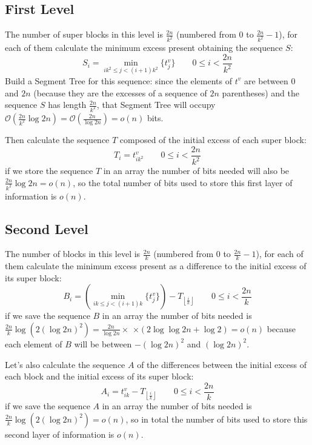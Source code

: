 \documentclass{article}
\begin{document}
\subsection{First Level}
The number of super blocks in this level is $\frac{2n}{k^2}$ (numbered from $0$ to $\frac{2n}{k^2}-1$), for each of them calculate the minimum excess present obtaining the sequence $S$:
    $$
    S_i = \min_{ik^2 \leq j < (i+1)k^2}\{t^v_j\} \qquad 0\leq i < \frac{2n}{k^2}
    $$
Build a Segment Tree for this sequence: since the elements of $t^v$ are between $0$ and $2n$ (because they are the excesses of a sequence of $2n$ parentheses) and the sequence $S$ has length $\frac{2n}{k^2}$, that Segment Tree will occupy $\mathcal{O}(\frac{2n}{k^2}\log{2n})=\mathcal{O}(\frac{2n}{\log{2n}})=o(n)$ bits.

Then calculate the sequence $T$ composed of the initial excess of each super block:
    $$
    T_i = t^v_{ik^2} \qquad 0\leq i < \frac{2n}{k^2}
    $$
if we store the sequence $T$ in an array the number of bits needed will also be $ \frac{2n}{k^2}\log{2n}=o(n)$, so the total number of bits used to store this first layer of information is $o(n)$.

\subsection{Second Level}
The number of blocks in this level is $\frac{2n}{k}$ (numbered from $0$ to $\frac{2n}{k}-1$), for each of them calculate the minimum excess present as a difference to the initial excess of its super block:
    $$
    B_i = \left(\min_{ik \leq j < (i+1)k}\{t^v_j\}\right)-T_{\left\lfloor{\frac{i}{k}}\right\rfloor} \qquad 0\leq i < \frac{2n}{k}
    $$
if we save the sequence $B$ in an array the number of bits needed is $\frac{2n}{k}\log{(2(\log{2n})^2)}=\frac{2n}{\log{2n}}\times$ $\times(2\log{\log{2n}}+\log{2})=o(n)$ because each element of $B$ will be between $-(\log{2n})^2$ and $(\log{2n})^2$.

Let's also calculate the sequence $A$ of the differences between the initial excess of each block and the initial excess of its super block:
    $$
    A_i = t^v_{ik}-T_{\left\lfloor{\frac{i}{k}}\right\rfloor} \qquad 0\leq i < \frac{2n}{k}
    $$
if we save the sequence $A$ in an array the number of bits needed is $\frac{2n}{k}\log{(2(\log{2n})^2)}=o(n)$, so in total the number of bits used to store this second layer of information is $o(n)$.
\end{document}
